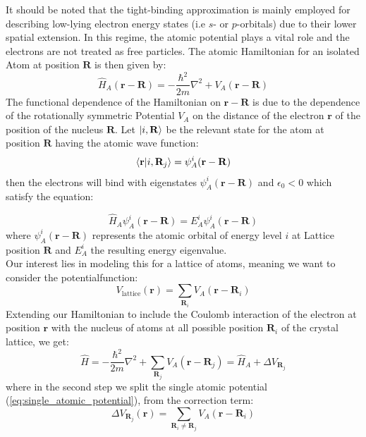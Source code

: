 \documentclass[11pt, a4paper]{article}
\theoremstyle{definition} %
\begin{document}
%
It should be noted that the tight-binding approximation is mainly employed for describing low-lying electron energy states (i.e $s$- or $p$-orbitals) due to their lower spatial extension. In this regime, the  atomic potential plays a vital role and the electrons are not treated as free particles. The atomic Hamiltonian for an isolated Atom at position $\mathbf{R}$ is then given by:
\begin{equation}
	\hat{H}_A(\mathbf{r} - \mathbf{R}) = -\frac{\hbar^2}{2m}\nabla^2 + V_A(\mathbf{r} - \mathbf{R})
	\label{eq:single_atomic_potential}
\end{equation}
The functional dependence of the Hamiltonian on $\mathbf{r} - \mathbf{R}$ is due to the dependence of the rotationally symmetric Potential $V_A$ on the distance of the electron $\mathbf{r}$ of the position of the nucleus $\mathbf{R}$. Let $\ket{i, \mathbf{R}}$ be the relevant state for the atom at position $\mathbf{R}$ having the atomic wave function:
\begin{equation}
	\braket{\mathbf{r}}{i, \mathbf{R}_j} = \psi_A^i(\mathbf{r} - \mathbf{R})
\end{equation}
then the electrons will bind with eigenstates $\psi_A^i(\mathbf{r - \mathbf{R}})$ and $\epsilon_0 < 0$ which satisfy the equation:




\begin{equation}
	\hat{H}_A \psi_A^i(\mathbf{r} - \mathbf{R}) = E_A^i \psi_A^i(\mathbf{r} - \mathbf{R})
\end{equation}
where $\psi_A^i(\mathbf{r} - \mathbf{R})$ represents the atomic orbital of energy level $i$ at Lattice position $\mathbf{R}$ and $E_A^i$ the resulting energy eigenvalue. \\

Our interest lies in modeling this for a lattice of atoms, meaning we want to consider the potentialfunction:
\begin{equation}
	V_\text{lattice}(\mathbf{r}) = \sum_{\mathbf{R}_i} V_A(\mathbf{r} - \mathbf{R}_i)
\end{equation}
 Extending our Hamiltonian to include the Coulomb interaction of the electron at position $\mathbf{r}$ with the nucleus of atoms at all possible position $\mathbf{R}_i$ of the crystal lattice, we get:
\begin{equation}
	\hat{H} = - \frac{\hbar^2}{2m} \nabla^2 + \sum_{\mathbf{R}_j} V_A(\mathbf{r} - \mathbf{R}_j) = \hat{H}_A + \Delta V_{\mathbf{R}_j}
\end{equation}
where in the second step we split the single atomic potential (\ref{eq:single_atomic_potential}), from the correction term:
\begin{equation}
	\Delta V_{\mathbf{R}_j}(\mathbf{r}) = \sum_{\mathbf{R}_i \neq \mathbf{R}_j} V_A(\mathbf{r} - \mathbf{R}_i)
\end{equation}
\end{document}

